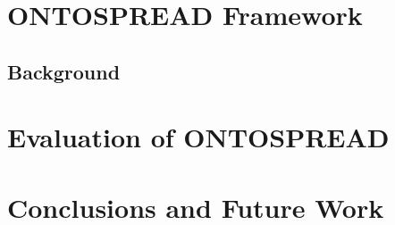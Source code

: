 \documentclass{article}[10pt]
\begin{document}
\section{ONTOSPREAD Framework}
\subsection{Background}\label{background}


\section{Evaluation of ONTOSPREAD}

\section{Conclusions and Future Work}


% 
% 
% 
% 





\end{document}
